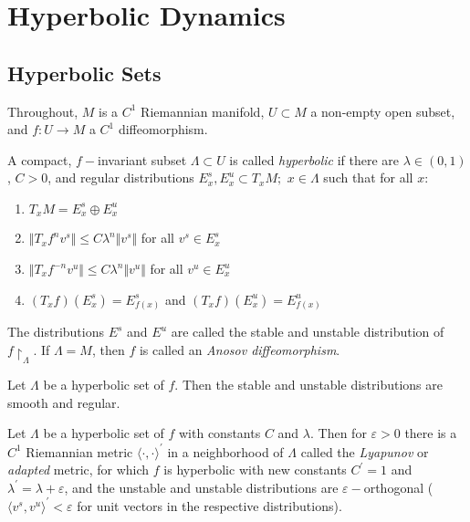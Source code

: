 \section{Hyperbolic Dynamics}
\subsection{Hyperbolic Sets}

\indent Throughout, $M$ is a $C^1$ Riemannian manifold, $U \subset M$ a non-empty open subset, and $f:U \to M$ a $C^1$ diffeomorphism. 

\begin{defn}

\indent A compact, $f-$invariant subset $\Lambda \subset U$ is called \textit{hyperbolic} if there are $\lambda \in (0,1)$, $C>0$, and regular distributions $E^s_x, E^u_x \subset T_x M; \hspace{4pt} x \in \Lambda$ such that for all $x$:
\begin{enumerate}
    \item $T_x M = E^s_x \oplus E^u_x$
    \item $\Vert T_x f^n v^s \Vert \leq C \lambda^n \Vert v^s \Vert$ for all $v^s \in E^s_x$
    \item $\Vert T_x f^{-n} v^u \Vert \leq C \lambda^n \Vert v^u \Vert $ for all $v^u \in E^u_x$
    \item $(T_x f) (E^s_x) = E^s_{f(x)}$ and $(T_xf)(E^u_x) = E^u_{f(x)}$
\end{enumerate}
\end{defn}

\indent The distributions $E^s$ and $E^u$ are called the stable and unstable distribution of $f \restriction_{\Lambda}$. If $\Lambda = M$, then $f$ is called an \textit{Anosov diffeomorphism}.

\begin{prop}

Let $\Lambda$ be a hyperbolic set of $f$. Then the stable and unstable distributions are smooth and regular.

\end{prop}


\begin{prop}
Let $\Lambda$ be a hyperbolic set of $f$ with constants $C$ and $\lambda$. Then for $\varepsilon > 0$ there is a $C^1$ Riemannian metric $\langle \cdot, \cdot \rangle^{\prime}$ in a neighborhood of $\Lambda$ called the \textit{Lyapunov} or \textit{adapted} metric, for which $f$ is hyperbolic with new constants $C^{\prime} = 1$ and $\lambda^{\prime}=\lambda + \varepsilon$, and the unstable and unstable distributions are $\varepsilon-$orthogonal ($\langle v^s, v^u \rangle^{\prime} < \varepsilon$ for unit vectors in the respective distributions).
\end{prop}

